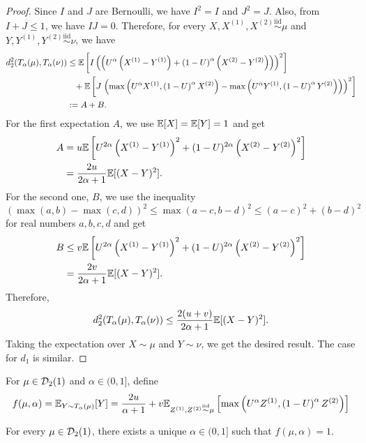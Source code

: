 \begin{proof}
  Since $I$ and $J$ are Bernoulli, we have $I^2 = I$ and $J^2 = J$. Also, from $I+J\le 1$, we have $IJ = 0$. Therefore, for every $X,X^{(1)},X^{(2)}\stackrel{\text{iid}}{\sim}\mu$ and $Y,Y^{(1)},Y^{(2)}\stackrel{\text{iid}}{\sim}\nu$, we have
  \begin{align*}
    d_2^2(T_\alpha(\mu), T_\alpha(\nu))
     & \le \mathbb{E}\left[I\left(\left(U^\alpha\left(X^{(1)}-Y^{(1)}\right) + \left(1-U\right)^\alpha\left(X^{(2)}-Y^{(2)}\right)\right)\right)^2\right]                                                      \\
     & \,\,\,\,\,+\mathbb{E} \left[J\left.\left(\max\left(U^\alpha X^{(1)}, \left(1-U\right)^\alpha X^{(2)}\right) - \max\left(U^\alpha Y^{(1)}, \left(1-U\right)^\alpha Y^{(2)}\right)\right)\right)^2\right] \\
     & := A+B.
  \end{align*}
  For the first expectation $A$, we use $\mathbb{E}[X] = \mathbb{E}[Y] = 1$ and get
  \begin{align*}
    A
     & = u\mathbb{E}\left[U^{2\alpha}\left(X^{(1)}-Y^{(1)}\right)^2 + (1-U)^{2\alpha}\left(X^{(2)}-Y^{(2)}\right)^2 \right] \\
     & = \dfrac{2u}{2\alpha+1}\mathbb{E}[(X-Y)^2].
  \end{align*}
  For the second one, $B$, we use the inequality
  $$(\max(a,b) - \max(c,d))^2 \le \max(a-c, b-d)^2 \le (a-c)^2+(b-d)^2$$
  for real numbers $a,b,c,d$ and get
  \begin{align*}
    B
     & \le v\mathbb{E}\left[U^{2\alpha}\left(X^{(1)}-Y^{(1)}\right)^2 + (1-U)^{2\alpha}\left(X^{(2)}-Y^{(2)}\right)^2 \right] \\
     & = \dfrac{2v}{2\alpha+1}\mathbb{E}[(X-Y)^2].
  \end{align*}
  Therefore,
  $$d_2^2(T_\alpha(\mu), T_\alpha(\nu)) \le \dfrac{2(u+v)}{2\alpha+1}\mathbb{E}[(X-Y)^2].$$
  Taking the expectation over $X\sim\mu$ and $Y\sim\nu$, we get the desired result. The case for $d_1$ is similar.
\end{proof}

For $\mu\in \mathcal{D}_2(1)$ and $\alpha\in(0,1]$, define
\begin{equation}
  \label{eq:f}
  f(\mu, \alpha) = \mathbb{E}_{Y\sim T_\alpha(\mu)}[Y]=\dfrac{2u}{\alpha+1} + v\mathbb{E}_{Z^{(1)}, Z^{(2)} \stackrel{\text{iid}}{\sim} \mu}\left[\max\left(U^\alpha Z^{(1)}, \left(1-U\right)^\alpha Z^{(2)}\right)\right]
\end{equation}

\begin{lemma}
  \label{prop:f}
  For every $\mu\in \mathcal{D}_2(1)$, there exists a unique $\alpha\in(0,1]$ such that $f(\mu, \alpha) = 1$.
\end{lemma}

